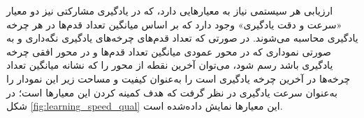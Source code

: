 ارزیابی هر سیستمی نیاز به معیارهایی دارد، که در یادگیری مشارکتی نیز دو معیار «سرعت و دقت یادگیری» وجود دارد که بر اساس میانگین تعداد قدم‌ها در هر چرخه یادگیری محاسبه می‌شوند. در صورتی که تعداد قدم‌های چرخه‌های یادگیری نگه‌داری و به صورتی نموداری که در محور عمودی میانگین تعداد قدم‌ها و در محور افقی چرخه یادگیری باشد رسم شود، می‌توان آخرین نقطه از محور را که نشانه میانگین تعداد چرخه‌ها در آخرین چرخه یادگیری است را به‌عنوان کیفیت و مساحت زیر این نمودار را به‌عنوان سرعت یادگیری در نظر گرفت که هدف کمینه کردن این معیارها است؛ در شکل \ref{fig:learning_speed_qual} این معیارها نمایش داده‌شده است.

